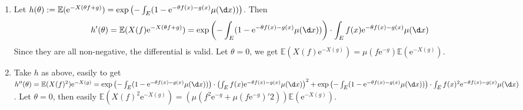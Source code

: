 \documentclass[../main]{subfiles}
\begin{document}
\begin{solution}
  \begin{enumerate}
    \item
      Let \(h(\theta):=\mathbb{E}(\mathrm{e}^{-X(\theta f + g)})=\exp\left(-\int_{E}(1-\mathrm{e}^{-\theta f(x) - g(x)} \mu(\d x))\right)\).
      Then
      \[
        h'(\theta)=\mathbb{E}(X(f)\mathrm{e}^{-X(\theta f + g)})=\exp\left(-\int_{E}(1-\mathrm{e}^{-\theta f(x) - g(x)} \mu(\d x))\right)\cdot \int_{E}f(x)\mathrm{e}^{-\theta f(x)-g(x)}\mu(\d x)
      \]
      Since they are all non-negative, the differential is valid.
      Let \(\theta = 0\), we get \(\mathbb{E}(X(f)\mathrm{e}^{-X(g)})=\mu(f \mathrm{e}^{-g})\mathbb{E}(\mathrm{e}^{-X(g)})\).
    \item Take \(h\) as above, easily to get \(h'' (\theta)=\mathbb{E}(X(f)^2)\mathrm{e}^{-X(g)}=\exp\left(-\int_{E}(1-\mathrm{e}^{-\theta f(x) - g(x)} \mu(\d x))\right)\cdot \left(\int_{E}f(x)\mathrm{e}^{-\theta f(x)-g(x)}\mu(\d x)\right)^2 + \exp\left(-\int_{E}(1-\mathrm{e}^{-\theta f(x) - g(x)} \mu(\d x))\right) \cdot \int_{E}f(x)^2 \mathrm{e}^{-\theta f(x) - g(x)}\mu(\d x)\).
      Let \(\theta =0\), then easily \(\mathbb{E}(X(f)^2 \mathrm{e}^{-X(g)})=(\mu(f^2 \mathrm{e}^{-g}+\mu(f \mathrm{e}^{-g})'2))\mathbb{E}(\mathrm{e}^{-X(g)})\).
  \end{enumerate}
\end{solution}
\end{document}
